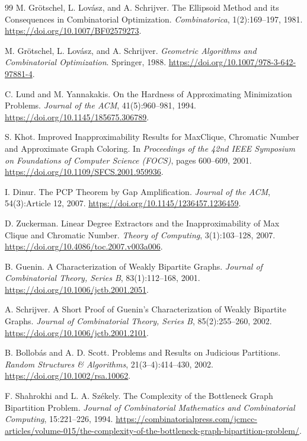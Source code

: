 \documentclass[11pt,a4paper]{ctexart}
\theoremstyle{definition}
\newcommand{\1}{\boldsymbol 1}
\newcommand{\0}{\boldsymbol 0}
\begin{document}
\begin{thebibliography}{99}
M. Gr\"otschel, L. Lov\'asz, and A. Schrijver.
\newblock The Ellipsoid Method and its Consequences in Combinatorial Optimization.
\newblock \emph{Combinatorica}, 1(2):169--197, 1981.
\newblock \url{https://doi.org/10.1007/BF02579273}.

M. Gr\"otschel, L. Lov\'asz, and A. Schrijver.
\newblock \emph{Geometric Algorithms and Combinatorial Optimization}.
\newblock Springer, 1988.
\newblock \url{https://doi.org/10.1007/978-3-642-97881-4}.

C. Lund and M. Yannakakis.
\newblock On the Hardness of Approximating Minimization Problems.
\newblock \emph{Journal of the ACM}, 41(5):960--981, 1994.
\newblock \url{https://doi.org/10.1145/185675.306789}.

S. Khot.
\newblock Improved Inapproximability Results for MaxClique, Chromatic Number and Approximate Graph Coloring.
\newblock In \emph{Proceedings of the 42nd IEEE Symposium on Foundations of Computer Science (FOCS)}, pages 600--609, 2001.
\newblock \url{https://doi.org/10.1109/SFCS.2001.959936}.

I. Dinur.
\newblock The PCP Theorem by Gap Amplification.
\newblock \emph{Journal of the ACM}, 54(3):Article 12, 2007.
\newblock \url{https://doi.org/10.1145/1236457.1236459}.

D. Zuckerman.
\newblock Linear Degree Extractors and the Inapproximability of Max Clique and Chromatic Number.
\newblock \emph{Theory of Computing}, 3(1):103--128, 2007.
\newblock \url{https://doi.org/10.4086/toc.2007.v003a006}.

B. Guenin.
\newblock A Characterization of Weakly Bipartite Graphs.
\newblock \emph{Journal of Combinatorial Theory, Series B}, 83(1):112--168, 2001.
\newblock \url{https://doi.org/10.1006/jctb.2001.2051}.

A. Schrijver.
\newblock A Short Proof of Guenin's Characterization of Weakly Bipartite Graphs.
\newblock \emph{Journal of Combinatorial Theory, Series B}, 85(2):255--260, 2002.
\newblock \url{https://doi.org/10.1006/jctb.2001.2101}.

B. Bollob\'as and A. D. Scott.
\newblock Problems and Results on Judicious Partitions.
\newblock \emph{Random Structures \& Algorithms}, 21(3--4):414--430, 2002.
\newblock \url{https://doi.org/10.1002/rsa.10062}.

F. Shahrokhi and L. A. Sz\'ekely.
\newblock The Complexity of the Bottleneck Graph Bipartition Problem.
\newblock \emph{Journal of Combinatorial Mathematics and Combinatorial Computing}, 15:221--226, 1994.
\newblock \url{https://combinatorialpress.com/jcmcc-articles/volume-015/the-complexity-of-the-bottleneck-graph-bipartition-problem/}.
\end{thebibliography}
\end{document}
